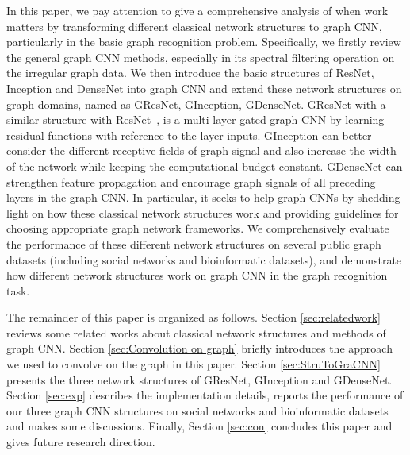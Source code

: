 \documentclass[journal]{IEEEtran}
\begin{document}
In this paper, we pay attention to give a comprehensive analysis of when work matters by transforming different classical network structures to graph CNN, particularly in the basic graph recognition problem.
Specifically, we firstly review the general graph CNN methods, especially in its spectral filtering operation on the irregular graph data.
We then introduce the basic structures of ResNet, Inception and DenseNet into graph CNN and extend these network structures on graph domains, named as G\underline{\hspace{0.5em}}ResNet, G\underline{\hspace{0.5em}}Inception, G\underline{\hspace{0.5em}}DenseNet.
G\underline{\hspace{0.5em}}ResNet with a similar structure with ResNet~\cite{resnet}, is a multi-layer gated graph CNN by learning residual functions with reference to the layer inputs.
G\underline{\hspace{0.5em}}Inception can better consider the different receptive fields of graph signal and also increase the width of the network while keeping the computational budget constant.
G\underline{\hspace{0.5em}}DenseNet can strengthen feature propagation and encourage graph signals of all preceding layers in the graph CNN.
In particular, it seeks to help graph CNNs by shedding light on how these classical network structures work and providing guidelines for choosing appropriate graph network frameworks.
We comprehensively evaluate the performance of these different network structures on several public graph datasets (including social networks and bioinformatic datasets), and demonstrate how different network structures work on graph CNN in the graph recognition task.

The remainder of this paper is organized as follows. Section \ref{sec:relatedwork} reviews some related works about classical network structures and methods of graph CNN. Section \ref{sec:Convolution on graph} briefly introduces the approach we used to convolve on the graph in this paper. Section \ref{sec:StruToGraCNN} presents the three network structures of G\underline{\hspace{0.5em}}ResNet, G\underline{\hspace{0.5em}}Inception and G\underline{\hspace{0.5em}}DenseNet. Section  \ref{sec:exp} describes the implementation details, reports the performance of our three graph CNN structures on social networks and bioinformatic datasets and makes some discussions. Finally, Section  \ref{sec:con} concludes this paper and gives future research direction.
\end{document}
